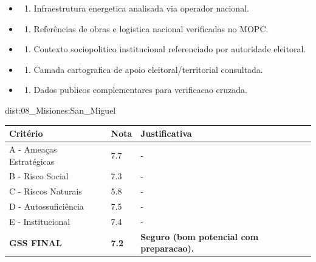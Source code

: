 {\begin{itemize}
\item
  \begin{enumerate}
  \def\labelenumi{\arabic{enumi})}
  \setcounter{enumi}{7}
  \tightlist
  \item
    Infraestrutura energetica analisada via operador nacional.
  \end{enumerate}
\item
  \begin{enumerate}
  \def\labelenumi{\arabic{enumi})}
  \setcounter{enumi}{8}
  \tightlist
  \item
    Referências de obras e logistica nacional verificadas no MOPC.
  \end{enumerate}
\item
  \begin{enumerate}
  \def\labelenumi{\arabic{enumi})}
  \setcounter{enumi}{9}
  \tightlist
  \item
    Contexto sociopolitico institucional referenciado por autoridade
    eleitoral.
  \end{enumerate}
\item
  \begin{enumerate}
  \def\labelenumi{\arabic{enumi})}
  \setcounter{enumi}{10}
  \tightlist
  \item
    Camada cartografica de apoio eleitoral/\allowbreak territorial consultada.
  \end{enumerate}
\item
  \begin{enumerate}
  \def\labelenumi{\arabic{enumi})}
  \setcounter{enumi}{11}
  \tightlist
  \item
    Dados publicos complementares para verificacao cruzada.
  \end{enumerate}
\end{itemize}}{dist:08_Misiones:San_Miguel}
\begin{table}[ht!]
\small \begin{tabular}{p{3.0cm}p{0.8cm}p{6.0cm}} \toprule
\textbf{Critério} & \textbf{Nota} & \textbf{Justificativa} \\ \midrule
A - Ameaças Estratégicas & 7.7 & - \\
B - Risco Social & 7.3 & - \\
C - Riscos Naturais & 5.8 & - \\
D - Autossuficiência & 7.5 & - \\
E - Institucional & 7.4 & - \\
\midrule \textbf{GSS FINAL} & \textbf{7.2} & \textbf{Seguro (bom potencial com preparacao).} \\ \bottomrule \end{tabular}
\end{table}
